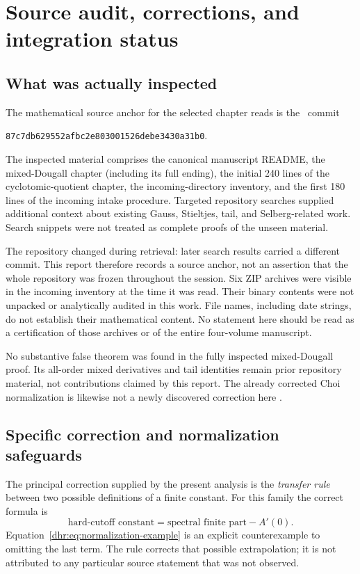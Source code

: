 \section{Source audit, corrections, and integration status}
\label{dhr:sec:audit}

\subsection{What was actually inspected}
The mathematical source anchor for the selected chapter reads is the
\repo\ commit
\begin{center}
\texttt{87c7db629552afbc2e803001526debe3430a31b0}.
\end{center}
The inspected material comprises the canonical manuscript README,
the mixed-Dougall chapter (including its full ending), the initial
240 lines of the cyclotomic-quotient chapter, the incoming-directory
inventory, and the first 180 lines of the incoming intake procedure.
Targeted repository searches supplied additional context about existing
Gauss, Stieltjes, tail, and Selberg-related work. Search snippets were
not treated as complete proofs of the unseen material.

The repository changed during retrieval: later search results carried
a different commit. This report therefore records a source anchor,
not an assertion that the whole repository was frozen throughout the
session. Six ZIP archives were visible in the incoming inventory at
the time it was read. Their binary contents were not unpacked or
analytically audited in this work. File names, including date strings,
do not establish their mathematical content. No statement here should
be read as a certification of those archives or of the entire four-volume
manuscript.

No substantive false theorem was found in the fully inspected
mixed-Dougall proof. Its all-order mixed derivatives and tail identities
remain prior repository material, not contributions claimed by this
report. The already corrected Choi normalization is likewise not a
newly discovered correction here \cite{repo:readme,repo:dougall}.

\subsection{Specific correction and normalization safeguards}
The principal correction supplied by the present analysis is the
\emph{transfer rule} between two possible definitions of a finite
constant. For this family the correct formula is
\[
 \text{hard-cutoff constant}
 =\text{spectral finite part}-A'(0).
\]
Equation~\eqref{dhr:eq:normalization-example} is an explicit
counterexample to omitting the last term. The rule corrects that
possible extrapolation; it is not attributed to any particular source
statement that was not observed.

